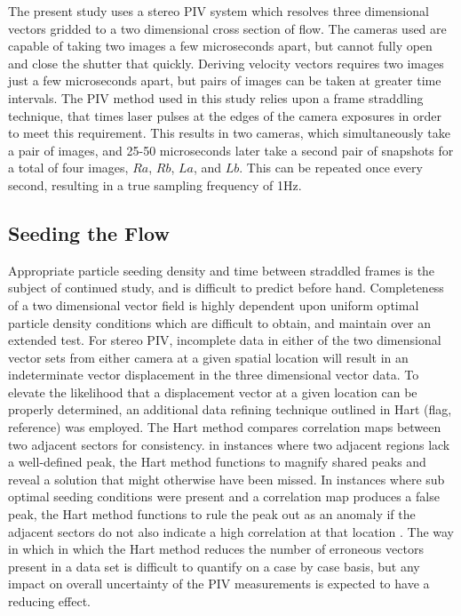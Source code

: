 The present study uses a stereo PIV system which resolves three dimensional 
vectors gridded to a two dimensional cross section of flow. The cameras used 
are capable of taking two images a few microseconds apart, 
but cannot fully open and close the shutter that quickly. Deriving velocity 
vectors requires two images just a few microseconds apart, but pairs of images 
can be taken at greater time intervals. The PIV method used in this study 
relies upon a frame straddling technique, that times laser pulses at the edges 
of the camera exposures in order to meet this requirement. This results in two 
cameras, which simultaneously take a pair of images, and 25-50 microseconds 
later take a second pair of snapshots for a total of four images, $Ra$, $Rb$, 
$La$, and $Lb$. This can be repeated once every second, resulting 
in a true sampling frequency of 1Hz.

\subsection{Seeding the Flow}

Appropriate particle seeding density and time between straddled frames is the
subject of continued study, and is difficult to predict before hand. 
Completeness of a two dimensional vector field is highly dependent upon 
uniform optimal particle density conditions which are difficult to obtain, and 
maintain over an extended test. For stereo PIV, incomplete data in either of 
the two dimensional vector 
sets from either camera at a given spatial location will result in an 
indeterminate vector displacement in the three dimensional vector data. To 
elevate the likelihood that a displacement vector at a given location can be 
properly determined, an additional data refining technique outlined in Hart 
(flag, reference) was employed. The Hart method compares correlation maps 
between two adjacent sectors for consistency. in instances where two adjacent 
regions lack a well-defined peak, the Hart method functions to magnify shared 
peaks and reveal a solution that might otherwise have been missed. In instances 
where sub optimal seeding conditions were present and a correlation map 
produces a false peak, the Hart method functions to rule the peak out as an 
anomaly if the adjacent sectors do not also indicate a high correlation at that 
location \cite{hart1998}. The way in which in which the Hart method reduces the 
number of erroneous vectors present in a data set is difficult to quantify on a 
case by case basis, but any impact on overall uncertainty of the PIV 
measurements is expected to have a reducing effect.